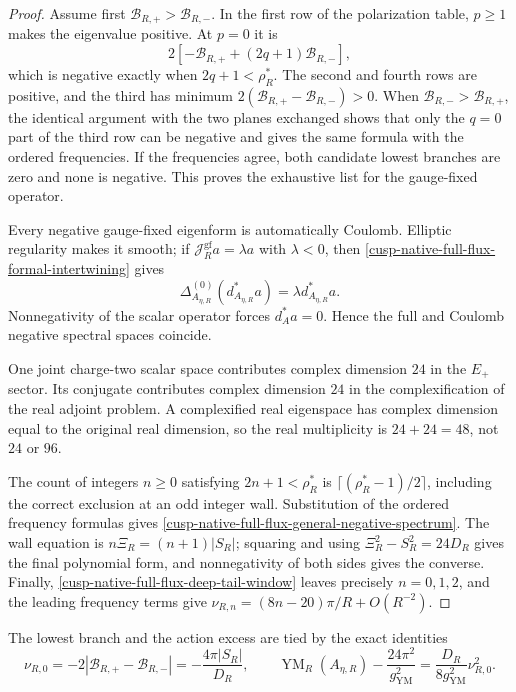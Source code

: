 \begin{proof}
Assume first \(\mathcal B_{R,+}>\mathcal B_{R,-}\).  In the first row of
the polarization table, \(p\ge1\) makes the eigenvalue positive.  At \(p=0\)
it is
\[
 2[-\mathcal B_{R,+}+(2q+1)\mathcal B_{R,-}],
\]
which is negative exactly when \(2q+1<\rho_R^*\).  The second and fourth
rows are positive, and the third has minimum
\(2(\mathcal B_{R,+}-\mathcal B_{R,-})>0\).  When
\(\mathcal B_{R,-}>\mathcal B_{R,+}\), the identical argument with the two
planes exchanged shows that only the \(q=0\) part of the third row can be
negative and gives the same formula with the ordered frequencies.  If the
frequencies agree, both candidate lowest branches are zero and none is
negative.  This proves the exhaustive list for the gauge-fixed operator.

Every negative gauge-fixed eigenform is automatically Coulomb.  Elliptic
regularity makes it smooth; if
\(\mathcal J_R^{\mathrm{gf}}a=\lambda a\) with \(\lambda<0\), then
\cref{cusp-native-full-flux-formal-intertwining} gives
\[
 \Delta_{A_{\eta,R}}^{(0)}(d_{A_{\eta,R}}^*a)
 =\lambda d_{A_{\eta,R}}^*a.
\]
Nonnegativity of the scalar operator forces \(d_A^*a=0\).  Hence the full and
Coulomb negative spectral spaces coincide.

One joint charge-two scalar space contributes complex dimension \(24\) in
the \(E_+\) sector.  Its conjugate contributes complex dimension \(24\) in
the complexification of the real adjoint problem.  A complexified real
eigenspace has complex dimension equal to the original real dimension, so
the real multiplicity is \(24+24=48\), not \(24\) or \(96\).

The count of integers \(n\ge0\) satisfying \(2n+1<\rho_R^*\) is
\(\lceil(\rho_R^*-1)/2\rceil\), including the correct exclusion at an odd
integer wall.  Substitution of the ordered frequency formulas gives
\cref{cusp-native-full-flux-general-negative-spectrum}.  The wall equation
is
\(n\Xi_R=(n+1)|S_R|\); squaring and using
\(\Xi_R^2-S_R^2=24D_R\) gives the final polynomial form, and nonnegativity of
both sides gives the converse.  Finally,
\cref{cusp-native-full-flux-deep-tail-window} leaves precisely
\(n=0,1,2\), and the leading frequency terms give
\(\nu_{R,n}=(8n-20)\pi/R+O(R^{-2})\).
\end{proof}

The lowest branch and the action excess are tied by the exact identities
\begin{equation}
 \nu_{R,0}=-2|\mathcal B_{R,+}-\mathcal B_{R,-}|
 =-\frac{4\pi|S_R|}{D_R},
 \qquad
 \operatorname{YM}_R(A_{\eta,R})-\frac{24\pi^2}{g_{\mathrm{YM}}^2}
 =\frac{D_R}{8g_{\mathrm{YM}}^2}\nu_{R,0}^2.
 \label{cusp-native-full-flux-action-instability}
\end{equation}


